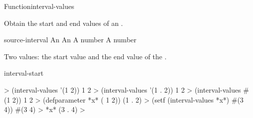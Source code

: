 \documentclass[10pt,twoside,english,pdftex]{article}
\begin{document}
\begin{functiondoc}{Function}{interval-values}%
  { 
    \returns{} }
%
%
%
%
%
%

\fnsyntax

\fnpurpose Obtain the start and end values of an .

\fnsetf
{}

\fnpackage {}

\fnmodule {}

\fnargs
\begin{args}{source-interval}
\arg[interval] An 
 An 
 A number
 A number
\end{args}

\fnreturns Two values: the start value and the end value of the .

\begin{alsos}{interval-start}
\end{alsos}

\fnexamples
%
%
\W\supp
\begin{example}
  > (interval-values '(1 2))
  1
  2
  > (interval-values '(1 . 2))
  1
  2
  > (interval-values #(1  2))
  1
  2\goodpagebreak
  > (defparameter *x* ( 1 2))
  (1 . 2)
  > (setf (interval-values *x*) #(3 4))
  #(3 4)
  > *x*
  (3 . 4)
  >
\end{example}

\end{functiondoc}

\end{document}
